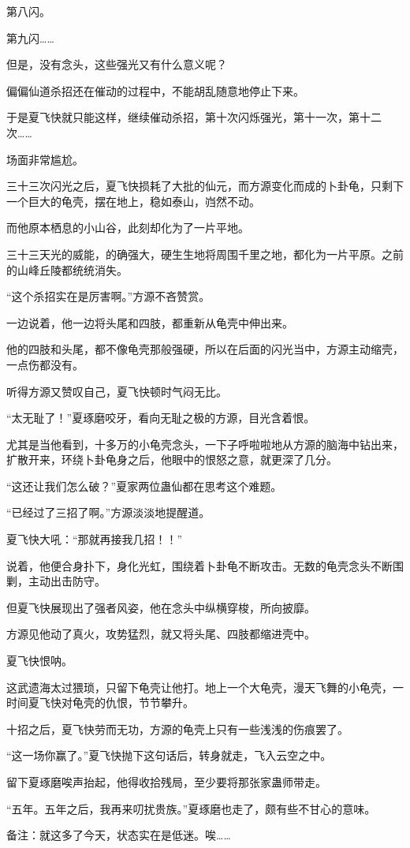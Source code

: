 \begin{this_body}
第八闪。

第九闪……

但是，没有念头，这些强光又有什么意义呢？

偏偏仙道杀招还在催动的过程中，不能胡乱随意地停止下来。

于是夏飞快就只能这样，继续催动杀招，第十次闪烁强光，第十一次，第十二次……

场面非常尴尬。

三十三次闪光之后，夏飞快损耗了大批的仙元，而方源变化而成的卜卦龟，只剩下一个巨大的龟壳，摆在地上，稳如泰山，岿然不动。

而他原本栖息的小山谷，此刻却化为了一片平地。

三十三天光的威能，的确强大，硬生生地将周围千里之地，都化为一片平原。之前的山峰丘陵都统统消失。

“这个杀招实在是厉害啊。”方源不吝赞赏。

一边说着，他一边将头尾和四肢，都重新从龟壳中伸出来。

他的四肢和头尾，都不像龟壳那般强硬，所以在后面的闪光当中，方源主动缩壳，一点伤都没有。

听得方源又赞叹自己，夏飞快顿时气闷无比。

“太无耻了！”夏琢磨咬牙，看向无耻之极的方源，目光含着恨。

尤其是当他看到，十多万的小龟壳念头，一下子呼啦啦地从方源的脑海中钻出来，扩散开来，环绕卜卦龟身之后，他眼中的恨怒之意，就更深了几分。

“这还让我们怎么破？”夏家两位蛊仙都在思考这个难题。

“已经过了三招了啊。”方源淡淡地提醒道。

夏飞快大吼：“那就再接我几招！！”

说着，他便合身扑下，身化光虹，围绕着卜卦龟不断攻击。无数的龟壳念头不断围剿，主动出击防守。

但夏飞快展现出了强者风姿，他在念头中纵横穿梭，所向披靡。

方源见他动了真火，攻势猛烈，就又将头尾、四肢都缩进壳中。

夏飞快恨呐。

这武遗海太过猥琐，只留下龟壳让他打。地上一个大龟壳，漫天飞舞的小龟壳，一时间夏飞快对龟壳的仇恨，节节攀升。

十招之后，夏飞快劳而无功，方源的龟壳上只有一些浅浅的伤痕罢了。

“这一场你赢了。”夏飞快抛下这句话后，转身就走，飞入云空之中。

留下夏琢磨唉声抬起，他得收拾残局，至少要将那张家蛊师带走。

“五年。五年之后，我再来叨扰贵族。”夏琢磨也走了，颇有些不甘心的意味。

备注：就这多了今天，状态实在是低迷。唉……

\end{this_body}

